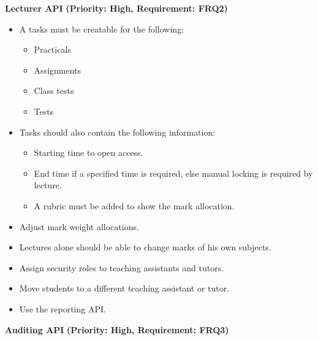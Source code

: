 \documentclass[12pt]{article}
\begin{document}
			\vspace{0.15in}
				
			\begin{flushleft}
				\textbf{Lecturer API}
				\textbf{(Priority: High, Requirement: FRQ2)}
			\end{flushleft}
			
				\begin{itemize}
					\item A tasks must be creatable for the following:
							\begin{itemize}
								\item Practicals
								\item Assignments
								\item Class tests
								\item Tests
							\end{itemize}
					\item Tasks should also contain the following information:
							\begin{itemize}
								\item Starting time to open access.
								\item End time if a specified time is required, else manual locking is required by lecture.
								\item A rubric must be added to show the mark allocation.
							\end{itemize}
					\item Adjust mark weight allocations.
					\item Lectures alone should be able to change marks of his own subjects.
					\item Assign security roles to teaching assistants and tutors.
					\item Move students to a different teaching assistant or tutor.
					\item Use the reporting API.
				\end{itemize}
				
			\vspace{0.15in}
			
			\begin{flushleft}	
				\textbf{Auditing API}
				\textbf{(Priority: High, Requirement: FRQ3)}
			\end{flushleft}
			
\end{document}
